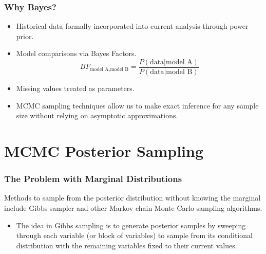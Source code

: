 \documentclass{beamer}
\begin{document}
\begin{frame}
\frametitle{Why Bayes?}
\begin{itemize}
\item Historical data formally incorporated into current analysis through \color{orange} power prior\color{black}.
\item Model comparisons via \color{orange} Bayes Factors\color{black}.
$$BF_{\text{model A}, \text{model B}} = \frac{P(\text{data}|\text{model A})}{P(\text{data}|\text{model B})}$$ 
\item \color{orange}Missing values \color{black}treated as parameters. 
\item MCMC sampling techniques allow us to make exact inference for \color{orange}any sample size \color{black}without relying on asymptotic approximations. 
\end{itemize}
\end{frame}

\section{MCMC Posterior Sampling}
\begin{frame}
\frametitle{The Problem with Marginal Distributions}
Methods to sample from the posterior distribution without knowing the marginal include Gibbs sampler and other Markov chain Monte Carlo sampling algorithms. 
\begin{itemize}
\item The idea in Gibbs sampling is to generate posterior samples by sweeping through each variable (or block of variables) to sample from its conditional distribution with the remaining variables fixed to their current values.\footnotemark
\end{itemize}
\end{frame}
\end{document}

